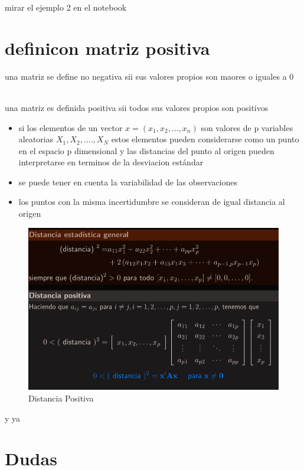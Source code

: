 \documentclass[10pt,a4paper]{article} %
\begin{document}
         \color{red} mirar el ejemplo 2 en el notebook \color{white}


    \section{definicon matriz positiva}
        una matriz se define \color{red} no negativa \color{white} sii
        \color{red} sus valores propios son maores o iguales a 0
        \color{white}

        \\ una matriz es definida \color{blue} positiva \color{white}
        sii \color{red} todos sus valores propios son positivos
        \color{white}

        \begin{itemize}
            \item {si los elementos de un vector $ x = (x_1 , x_2 , ...
                , x_n )  $ son valores de p variables aleatorias $ X_1
            , X_2 , ...., X_N  $  estos elementos pueden considerarse
            como un punto en el espacio p dimensional y las distancias del
            punto al origen pueden interpretarse en terminos de la desviacion
            estándar }
            \item {se puede tener en cuenta la variabilidad de las observaciones}
            \item {los puntos con la misma \color{blue} incertidumbre
                \color{white} se consideran de igual distancia  al origen}
        \end{itemize}
        \begin{figure}[h!]
            \centering
            \includegraphics[width=0.5\linewidth]{dispos.png}
            \caption{Distancia Positiva}
            \label{fig:dispos}
        \end{figure}
            y ya

    \section{Dudas}
\end{document}
